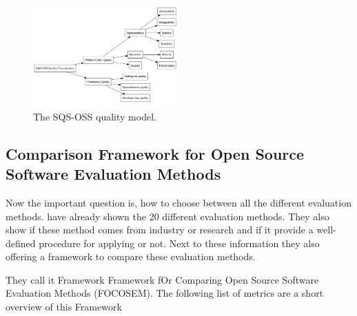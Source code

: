 \documentclass[DIV=calc,paper=a4,fontsize=9pt,twocolumn]{scrartcl}
\begin{document}
\begin{figure}[ht]
    \includegraphics[width=0.5\textwidth ]{img/sqsoss.png}{}
    \centering
    \caption{The SQS-OSS quality model. \citet{samoladas2008sqo}}\label{fig:sqs-oss}
\end{figure}

\subsection{Comparison Framework for Open Source Software Evaluation Methods}

Now the important question is, how to choose between all the different evaluation methods. \citet{stol2010comparison} have already shown the 20 different evaluation methods. They also show if these method comes from industry or research and if it provide a well-defined procedure for applying or not. Next to these information they also offering a framework to compare these evaluation methods.

They call it Framework Framework fOr Comparing Open Source Software Evaluation Methods (FOCOSEM). The following list of metrics are a short overview of this Framework
\end{document}
